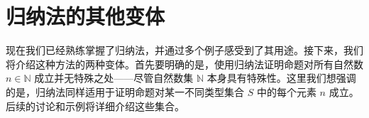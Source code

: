 \section{归纳法的其他变体}

现在我们已经熟练掌握了归纳法，并通过多个例子感受到了其用途。接下来，我们将介绍这种方法的两种变体。首先要明确的是，使用归纳法证明命题对所有自然数 $n \in \mathbb{N}$ 成立并无特殊之处——尽管自然数集 $\mathbb{N}$ 本身具有特殊性。这里我们想强调的是，归纳法同样适用于证明命题对某一不同类型集合 $S$ 中的每个元素 $n$ 成立。后续的讨论和示例将详细介绍这些集合。







